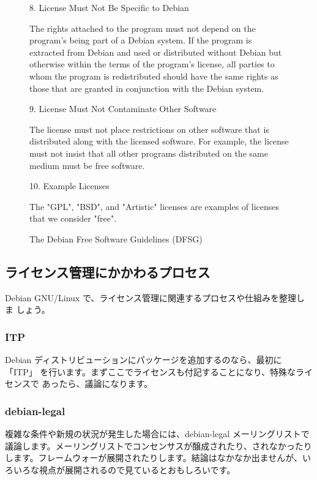 \documentclass[mingoth,a4paper]{jsarticle}
\begin{document}
\begin{figure}[h]
\begin{multicols}{2}
{    8. License Must Not Be Specific to Debian

       The rights attached to the program must not depend on the
       program's being part of a Debian system. If the program is
       extracted from Debian and used or distributed without Debian but
       otherwise within the terms of the program's license, all parties
       to whom the program is redistributed should have the same rights
       as those that are granted in conjunction with the Debian system.

    9. License Must Not Contaminate Other Software

       The license must not place restrictions on other software that is
       distributed along with the licensed software. For example, the
       license must not insist that all other programs distributed on the
       same medium must be free software.

   10. Example Licenses

       The "GPL", "BSD", and "Artistic" licenses are examples of licenses
       that we consider "free".
 }
 \end{multicols}
\caption{The Debian Free Software Guidelines (DFSG)}
\label{fig:dfsg}
\end{figure}


\subsection{ライセンス管理にかかわるプロセス}

Debian GNU/Linux で、ライセンス管理に関連するプロセスや仕組みを整理しま
しょう。

\subsubsection{ITP}

Debian ディストリビューションにパッケージを追加するのなら、最初に「ITP」
を行います。まずここでライセンスも付記することになり、特殊なライセンスで
あったら、議論になります。

\subsubsection{debian-legal}

複雑な条件や新規の状況が発生した場合には、debian-legal メーリングリストで
議論します。メーリングリストでコンセンサスが醸成されたり、されなかったり
します。フレームウォーが展開されたりします。結論はなかなか出ませんが、い
ろいろな視点が展開されるので見ているとおもしろいです。
\end{document}

